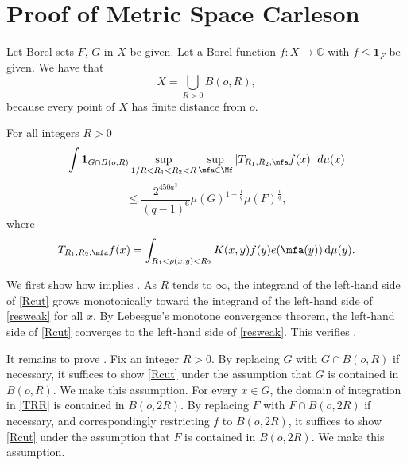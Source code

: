 \chapter{Proof of Metric Space Carleson}
\label{thmfromproplinear}


Let Borel sets $F$, $G$ in $X$ be given. Let a Borel function $f: X \to \mathbb{C}$ with $f \le \mathbf{1}_F$ be given.
We have that
\begin{equation}
    X=\bigcup_{R>0}B(o,R),
\end{equation} because every point of $X$
has finite distance from $o$.
\begin{lemma}[R truncation]
    \label{R-truncation}
    For all integers $R>0$
    $$
        \int \mathbf{1}_{G\cap B(o,R)}
        \sup_{1/R<R_1<R_2<R}\sup_{\mfa\in\Mf}
        \left| T_{R_1,R_2,\mfa} f(x) \right|\, d\mu(x)
    $$
    \begin{equation} \label{Rcut}
        \leq \frac{2^{450a^3}}{(q-1)^6} \mu(G)^{1-\frac{1}{q}} \mu(F)^{\frac{1}{q}},
    \end{equation}
    where
    \begin{equation}\label{TRR}
        T_{R_1,R_2,\mfa} f(x)=
        \int_{R_1 < \rho(x,y) < R_2} K(x,y) f(y) e(\mfa(y)) \, \mathrm{d}\mu(y) .
    \end{equation}
\end{lemma}

We first show how  implies . As $R$ tends to $\infty$, the integrand of the left-hand side of \eqref{Rcut} grows monotonically toward the integrand of the left-hand side of \eqref{resweak} for all $x$. By Lebesgue's monotone convergence theorem, the left-hand side of \eqref{Rcut} converges to the left-hand side of \eqref{resweak}. This verifies .

It remains to prove . Fix an integer $R>0$. By replacing $G$ with $G\cap B(o,R)$ if necessary, it suffices to show \eqref{Rcut} under the assumption that $G$ is contained in $B(o,R)$. We make this assumption. For every $x\in G$, the domain of integration in \eqref{TRR} is contained in $B(o,2R)$. By replacing $F$ with $F\cap B(o,2R)$ if necessary, and correspondingly restricting $f$ to $B(o, 2R)$, it suffices to show \eqref{Rcut} under the assumption that $F$ is contained in $B(o,2R)$. We make this assumption.

